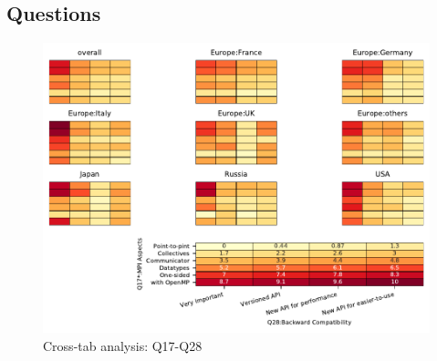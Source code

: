 
\subsection{Questions}


\begin{figure}
\begin{center}
\includegraphics[width=12cm]{../pdfs/Q17-Q28.pdf}
\caption{Cross-tab analysis: Q17-Q28}
\label{fig:Q17-Q28}
\end{center}
\end{figure}
